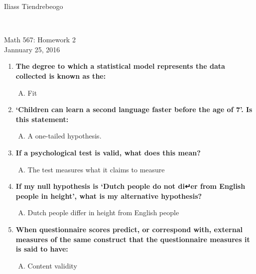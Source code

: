 \documentclass{article}[14pt]
\begin{document}
\hfill Iliass Tiendrebeogo\\

\hfill \date{Jannuary 25, 2016} \\

\bigskip

\begin{center}
  \begin{Large}
    Math 567: Homework 2\\
    Jannuary 25, 2016\\
   
  \end{Large}
\end{center} 


\begin{enumerate}[1.]
\item  %
{\bf The degree to which a statistical model represents the data collected is known as the: }
 \begin{enumerate}[A.]
 \item 
  Fit
\end{enumerate}
\item %
{\bf ‘Children can learn a second language faster before the age of 7’. Is this statement: }
 \begin{enumerate}[D.]
 \item 
  A one-tailed hypothesis.
\end{enumerate}

\item %
 {\bf If a psychological test is valid, what does this mean?}
 \begin{enumerate}[B.]
 \item 
  The test measures what it claims to measure
  \end{enumerate}

\item %
 {\bf If my null hypothesis is ‘Dutch people do not di↵er from English people in height’, what is my alternative
hypothesis?}
 \begin{enumerate}[C.]
 \item 

  Dutch people differ in height from English people
  \end{enumerate}
 \item %
 {\bf  When questionnaire scores predict, or correspond with, external measures of the same construct that
the questionnaire measures it is said to have:}
 \begin{enumerate}[C.]
 \item 
  Content validity
\end{enumerate}


\end{enumerate}
\end{document}
